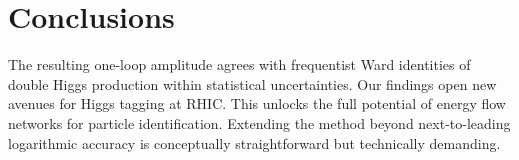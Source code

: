 \section{Conclusions}\label{sec:conclusions}

The resulting one-loop amplitude agrees with frequentist Ward identities
of double Higgs production within statistical uncertainties. Our
findings open new avenues for Higgs tagging at RHIC. This unlocks the
full potential of energy flow networks for particle identification.
Extending the method beyond next-to-leading logarithmic accuracy is
conceptually straightforward but technically demanding.

